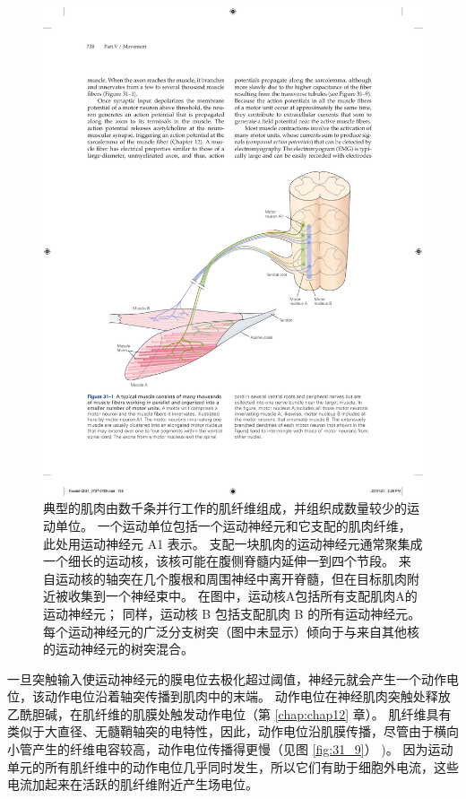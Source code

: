 \begin{figure}[htbp]
	\centering
	\includegraphics[width=0.9\linewidth]{chap31/fig_31_1}
	\caption{典型的肌肉由数千条并行工作的肌纤维组成，并组织成数量较少的运动单位。 
		一个运动单位包括一个运动神经元和它支配的肌肉纤维，此处用运动神经元 A1 表示。 支配一块肌肉的运动神经元通常聚集成一个细长的运动核，该核可能在腹侧脊髓内延伸一到四个节段。 来自运动核的轴突在几个腹根和周围神经中离开脊髓，但在目标肌肉附近被收集到一个神经束中。 在图中，运动核A包括所有支配肌肉A的运动神经元； 同样，运动核 B 包括支配肌肉 B 的所有运动神经元。每个运动神经元的广泛分支树突（图中未显示）倾向于与来自其他核的运动神经元的树突混合。}
	\label{fig:31_1}
\end{figure}


一旦突触输入使运动神经元的膜电位去极化超过阈值，神经元就会产生一个动作电位，该动作电位沿着轴突传播到肌肉中的末端。
动作电位在神经肌肉突触处释放乙酰胆碱，在肌纤维的肌膜处触发动作电位（第 \ref{chap:chap12} 章）。
肌纤维具有类似于大直径、无髓鞘轴突的电特性，因此，动作电位沿肌膜传播，尽管由于横向小管产生的纤维电容较高，动作电位传播得更慢（见图 \ref{fig:31_9}） )。
因为运动单元的所有肌纤维中的动作电位几乎同时发生，所以它们有助于细胞外电流，这些电流加起来在活跃的肌纤维附近产生场电位。



